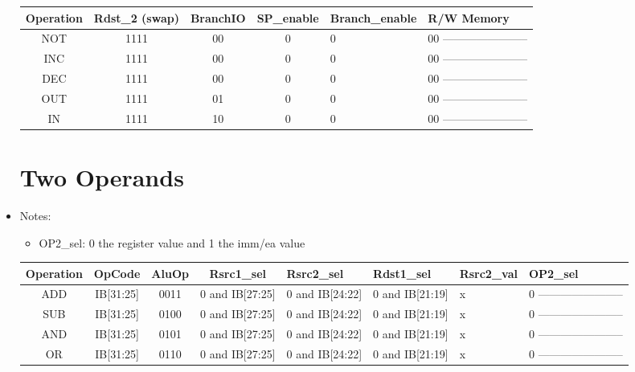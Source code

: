 \documentclass[12pt]{report}
\begin{document}
\begin{itemize}
\begin{center}
\begin{tabular}{||c| c| c| c| p{40mm}||}
        \end{tabular}
        \end{center}

        \begin{center}
        \begin{tabular}{||c| c| c| c| p{40mm}||} 
        \hline
        Operation & Rdst_2 (swap) & BranchIO & SP_enable & Branch_enable & R/W Memory  \\ [0.5ex] 
        \hline\hline
        NOT & 1111 & 00 & 0 & 0 & 00 ----------------------- \\
        INC & 1111 & 00 & 0 & 0 & 00 ----------------------- \\
        DEC & 1111 & 00 & 0 & 0 & 00 ----------------------- \\
        OUT & 1111 & 01 & 0 & 0 & 00 ----------------------- \\
        IN  & 1111 & 10 & 0 & 0 & 00 ----------------------- \\
        \hline

        \end{tabular}
        \end{center}


        \section{Two Operands}
        \item Notes:
        \begin{itemize}
            \item OP2_sel: 0 the register value and 1 the imm/ea value
        \end{itemize}

        \begin{center}
        \begin{tabular}{||c| c| c| c| p{40mm}||} 
        \hline
        Operation & OpCode & AluOp & Rsrc1_sel & Rsrc2_sel & Rdst1_sel & Rsrc2_val & OP2_sel  \\ [0.5ex] 
        \hline\hline
        ADD & IB[31:25] & 0011 & 0 and IB[27:25] & 0 and IB[24:22] & 0 and IB[21:19] & x & 0 ----------------------- \\
        SUB & IB[31:25] & 0100 & 0 and IB[27:25] & 0 and IB[24:22] & 0 and IB[21:19] & x & 0 ----------------------- \\
        AND & IB[31:25] & 0101 & 0 and IB[27:25] & 0 and IB[24:22] & 0 and IB[21:19] & x & 0 ----------------------- \\
        OR  & IB[31:25] & 0110 & 0 and IB[27:25] & 0 and IB[24:22] & 0 and IB[21:19] & x & 0 ----------------------- \\
        

\end{tabular}
\end{center}
\end{itemize}
\end{document}
